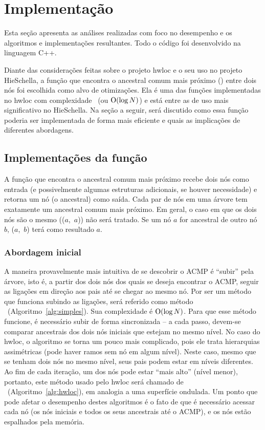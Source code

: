 \chapter{Implementação}
\label{cap:implementacao}

Esta seção apresenta as análises realizadas com foco no desempenho e os algoritmos e implementações resultantes.
Todo o código foi desenvolvido na linguagem C++.

Diante das considerações feitas sobre o projeto hwloc e o seu uso no projeto HieSchella, a função que encontra o ancestral comum mais próximo (\fACMP) entre dois nós foi escolhida como alvo de otimizações.
Ela é uma das funções implementadas no hwloc com complexidade \Oalt\ (ou $\operatorname{O}(\log N)$) e está entre as de uso mais significativo no HieSchella.
Na seção a seguir, será discutido como essa função poderia ser implementada de forma mais eficiente e quais as implicações de diferentes abordagens.


\section{Implementações da função \fACMP}

A função que encontra o ancestral comum mais próximo recebe dois nós como entrada (e possivelmente algumas estruturas adicionais, se houver necessidade)
e retorna um nó (o ancestral) como saída.
Cada par de nós em uma árvore tem exatamente um ancestral comum mais próximo.
Em geral, o caso em que os dois nós são o mesmo (\fACMP($a$,~$a$)) não será tratado.
Se um nó $a$ for ancestral de outro nó $b$, \fACMP($a$,~$b$) terá como resultado $a$.

\subsection{Abordagem inicial}

A maneira provavelmente mais intuitiva de se descobrir o ACMP é ``subir'' pela árvore, isto é, a partir dos dois nós dos quais se deseja encontrar o ACMP,
seguir as ligações em direção aos pais até se chegar ao mesmo nó.
Por ser um método que funciona subindo as ligações, será referido como método \Simples\ (Algoritmo~\ref{alg:simples}).
Sua complexidade é $\operatorname{O}(\log N)$.
Para que esse método funcione, é necessário subir de forma sincronizada -- a cada passo, devem-se comparar ancestrais dos dois nós iniciais que estejam no mesmo nível.
No caso do hwloc, o algoritmo se torna um pouco mais complicado, pois ele trata hierarquias assimétricas (pode haver ramos sem nó em algum nível).
Neste caso, mesmo que se tenham dois nós no mesmo nível, seus pais podem estar em níveis diferentes.
Ao fim de cada iteração, um dos nós pode estar ``mais alto'' (nível menor), portanto, este método usado pelo hwloc será chamado de \Hwloc\ (Algoritmo~\ref{alg:hwloc}), em analogia a uma superfície ondulada.
Um ponto que pode afetar o desempenho destes algoritmos é o fato de que é necessário acessar cada nó
(os nós iniciais e todos os seus ancestrais até o ACMP), e os nós estão espalhados pela memória.

